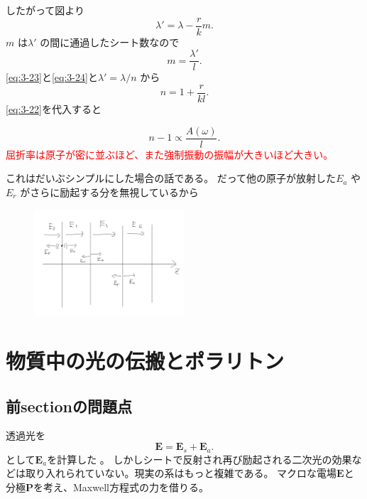 \documentclass[dvipdfmx,12pt]{jsarticle}
\begin{document}
したがって図より
\begin{equation}
\label{eq:3-23}
	\lambda'=\lambda-\frac{r}{k}m
.\end{equation}
$m$ は$\lambda'$ の間に通過したシート数なので
\begin{equation}
\label{eq:3-24}
	m=\frac{\lambda'}{l}
.\end{equation}
\eqref{eq:3-23}と\eqref{eq:3-24}と$\lambda' = \lambda /n$ から
\begin{equation}
\label{eq:3-25}
	n=1+\frac{r}{kl}
.\end{equation}
\eqref{eq:3-22}を代入すると
\begin{tcolorbox}[colback=green!10!white]
\[
n-1 \propto \frac{A(\omega)}{l}
.\] 
\textcolor{red}{屈折率は原子が密に並ぶほど、また強制振動の振幅が大きいほど大きい。}
\end{tcolorbox}

これはだいぶシンプルにした場合の話である。
だって他の原子が放射した$E_a$ や$E_r$ がさらに励起する分を無視しているから
\begin{figure}[H]
	\centering
	\includegraphics[width=0.5\textwidth]{fig3/Fig-8.jpg}
	\label{fig:fig3-Fig-8-jpg}
\end{figure}
\section{物質中の光の伝搬とポラリトン}
\subsection{前sectionの問題点}
透過光を
\begin{equation}
\label{eq:3-1}
\bm{E}=\bm{E}_s+\bm{E}_a
.\end{equation}
として$\bm{E}_a$を計算した
。
しかしシートで反射され再び励起される二次光の効果などは取り入れられていない。現実の系はもっと複雑である。
マクロな電場$\bm{E}$と分極$\bm{P}$を考え、Maxwell方程式の力を借りる。
\end{document}
